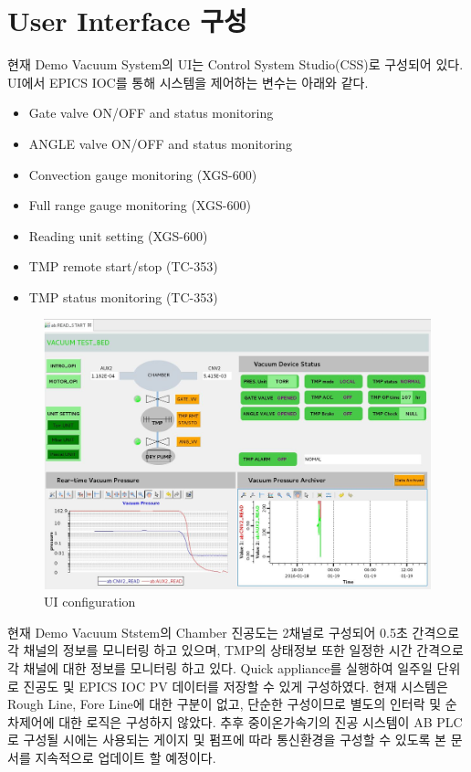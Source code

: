 \documentclass[11pt
  , a4paper
  , article
  , oneside
]{memoir}
\begin{document}
\newpage

\chapter{User Interface 구성}
	
현재 Demo Vacuum System의 UI는 Control System Studio(CSS)로 구성되어 있다. UI에서 EPICS IOC를 통해 시스템을 제어하는 변수는 아래와 같다.\\

\begin{itemize}
	
	\item Gate valve ON/OFF and status monitoring 
	\item ANGLE valve ON/OFF and status monitoring	 
	\item Convection gauge monitoring (XGS-600)
	\item Full range gauge monitoring (XGS-600)
	\item Reading unit setting (XGS-600)
	\item TMP remote start/stop (TC-353)
	\item TMP status monitoring (TC-353)
	
\end{itemize}

\begin{figure}[h]
	\centering
	\includegraphics[width=1\textwidth]{./picture/UI1.JPG}
	\caption{UI configuration}
	\label{fig:}
\end{figure}

현재 Demo Vacuum Ststem의 Chamber 진공도는 2채널로 구성되어 0.5초 간격으로 각 채널의 정보를 모니터링 하고 있으며, TMP의 상태정보 또한 일정한 시간 간격으로 각 채널에 대한 정보를 모니터링 하고 있다. Quick appliance를 실행하여 일주일 단위로 진공도 및 EPICS IOC PV 데이터를 저장할 수 있게 구성하였다. 현재 시스템은 Rough Line, Fore Line에 대한 구분이 없고, 단순한 구성이므로 별도의 인터락 및 순차제어에 대한 로직은 구성하지 않았다. 추후 중이온가속기의 진공 시스템이 AB PLC로 구성될 시에는 사용되는 게이지 및 펌프에 따라 통신환경을 구성할 수 있도록 본 문서를 지속적으로 업데이트 할 예정이다.   
\end{document}
